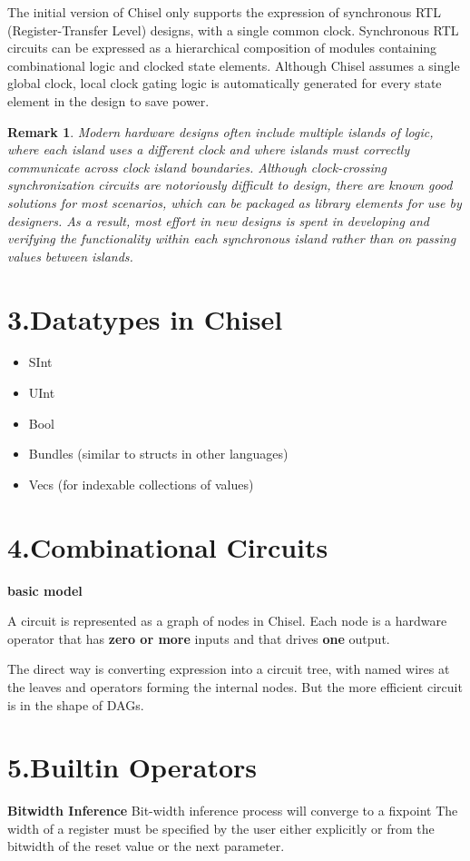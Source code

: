 \documentclass[11pt]{article}
\newtheorem*{remark}{Remark}
\begin{document}
The initial version of Chisel only supports the expression of synchronous RTL (Register-Transfer Level)
designs, with a single common clock. Synchronous
RTL circuits can be expressed as a hierarchical composition of modules containing combinational logic
and clocked state elements. Although Chisel assumes
a single global clock, local clock gating logic is automatically generated for every state element in the
design to save power.
\begin{remark}
	Modern hardware designs often include multiple islands of logic, where each island uses a different clock
	and where islands must correctly communicate across
	clock island boundaries. Although clock-crossing synchronization circuits are notoriously difficult to design, there are known good solutions for most scenarios, which can be packaged as library elements for use
	by designers. As a result, most effort in new designs
	is spent in developing and verifying the functionality within each synchronous island rather than on
	passing values between islands.
\end{remark}

\section*{3.Datatypes in Chisel}
\begin{itemize}
	\item SInt
	\item UInt
	\item Bool
	\item Bundles (similar to structs in other languages)
	\item Vecs (for indexable collections of values)
\end{itemize}

\section*{4.Combinational Circuits}
\textbf{basic model}

A circuit is represented as a graph of nodes in Chisel. Each node is a hardware operator that has \textbf{zero or more} inputs and that drives \textbf{one} output.

The direct way is converting expression into a circuit tree, with named wires at the leaves and operators forming the internal nodes. But the more efficient circuit is in the shape of DAGs.

\section*{5.Builtin Operators}
\textbf{Bitwidth Inference}
Bit-width inference process will converge to a fixpoint
The width of a register must be specified by the user either explicitly or from the bitwidth of the reset value or the next parameter.
\end{document}
